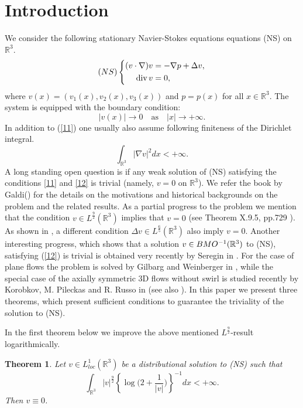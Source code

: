 \documentclass[12pt]{article}
\numberwithin{equation}{section}
\newtheorem{thm}{Theorem}[section]
\theoremstyle{definition}
\begin{document}
\section{Introduction}
\setcounter{equation}{0}
We consider the following stationary Navier-Stokes equations equations (NS) on $\mathbb{R}^3$.
$$
(NS)\left\{\aligned
(v\cdot\nabla)v&=-\nabla p + \Delta v,\\
\text{div}\, v &=0,
\endaligned
\right.
$$
where $v(x)=(v_1(x),v_2(x),v_3(x))$ and $p=p(x)$ for all $x\in\mathbb{R}^3$. The system is equipped with the boundary condition:
\begin{equation}
|v(x)|\rightarrow 0\quad \text{as} \quad|x|\rightarrow +\infty.\label{11}
\end{equation}
In addition to (\ref{11}) one usually also assume following finiteness of the  Dirichlet integral.
\begin{equation}
\int_{\mathbb{R}^3}|\nabla v|^2 dx < +\infty . \label{12}
\end{equation}
    A long standing open question is if any weak solution of (NS) satisfying the conditions \eqref{11} and \eqref{12}  is  trivial (namely, $v=0$ on $\mathbb{R}^3$).   We refer the book by Galdi(\cite{Galdi}) for the details on the motivations and historical backgrounds on the problem and the related results.
As a partial progress to the problem we mention that the condition $v\in L^{\frac{9}{2}}(\mathbb{R}^3)$ implies that
$v=0$ (see Theorem X.9.5, pp.729 \cite{Galdi}). As shown in \cite{cha1},  a different condition $\Delta v \in L^{\frac{6}{5}}(\mathbb{R}^3)$ also 
 imply $v=0$.  Another interesting progress, which shows that a solution $v\in BMO^{-1} (\Bbb R^3)$ to (NS), satisfying (\ref{12}) is trivial is obtained very recently by Seregin in \cite{ser}. For the case of plane flows the problem is solved by Gilbarg and Weinberger in \cite{Gil}, while the special case of the axially symmetric 3D flows without swirl is studied recently by Korobkov, M. Pileckas and R. Russo in \cite{Kor}(see also \cite{Koch}). In this paper we present three theorems, which present sufficient conditions to guarantee the triviality of the solution to (NS).

In the first theorem below we improve the above mentioned $L^{\frac92}$-result logarithmically.
\begin{thm}
\label{thm2.1}
Let $ {v} \in L^1_{ loc}({\mathbb{R}}^{3})$ be a distributional solution to (NS) such that 
\begin{equation}
{\int\limits}_{ {\mathbb{R}}^{3}}  | {v} |^{\frac92}\left\{\log \Big(2+ \frac{1}{|{v}|}\Big)\right\}^{ -1} dx <+\infty.
\label{2.1aa}
\end{equation}   
Then $ {v} \equiv { 0}$.
\end{thm}
\end{document}
